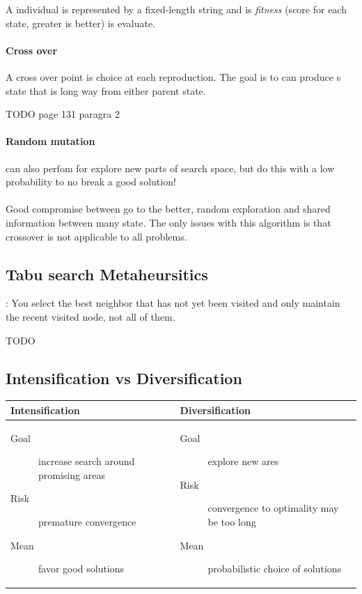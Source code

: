 A individual is represented by a fixed-length string and is \textit{fitness}
(score for each state, greater is better) is evaluate.

\paragraph{Cross over} A cross over point is choice at each reproduction.
The goal is to can produce s state that is long way from either parent state.

TODO page 131 paragra 2


\paragraph{Random mutation } can also perfom for explore new parts of
search space, but do this with a low probability to no break a good solution!


\paragraph{ } 
Good compromise between go to the better, random exploration and shared information
between many state.
The only issues with this algorithm is that crossover is not applicable to all problems.



\subsection{Tabu search Metaheursitics}:
You select  the best  neighbor that  has not yet  been visited  and only
maintain the recent visited node, not all of them.

TODO

\subsection{Intensification vs Diversification}
\begin{tabular}{m{8cm}|m{8cm}}
Intensification & Diversification \\
\hline

	\begin{description}
		\item[Goal] increase search around promising areas
		\item[Risk] premature convergence
		\item[Mean] favor good solutions
	\end{description}
&
	\begin{description}
		\item[Goal] explore new ares
		\item[Risk] convergence to optimality may be too long
		\item[Mean] probabilistic choice of solutions
	\end{description}
\end{tabular}

